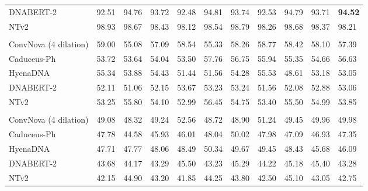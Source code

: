 \begin{table}[htbp]
{\begin{tabular}{lllllllllll}
    DNABERT-2 & 92.51  & 94.76  & 93.72  & 92.48  & 94.81  & 93.74  & 92.53  & 94.79  & 93.71  & \textbf{94.52} \\
    NTv2 & 98.93 & 98.67 & 98.43 & 98.12 & 98.54 & 98.79 & 98.26 & 98.68 & 98.37 & 98.21 \\
    \midrule
    \rowcolor{titlebg}\multicolumn{11}{l}{\textit{\textbf{Enhancer}}} \\
    \rowcolor{low}ConvNova (4 dilation)  & 59.00    & 55.08 & 57.09 & 58.54 & 55.33 & 58.26 & 58.77 & 58.42 & 58.10  & 57.39 \\
    Caduceus-Ph & 53.72 & 53.64 & 54.04 & 53.50  & 57.76 & 56.75 & 55.94 & 55.35 & 54.66 & 56.63 \\
    HyenaDNA & 55.34 & 53.88 & 54.43 & 51.44 & 51.56 & 54.28 & 55.53 & 48.61 & 53.18 & 53.05 \\
    DNABERT-2  & 52.11 & 51.06 & 52.15 & 53.67 & 53.23 & 53.24 & 51.56 & 52.08 & 52.88 & 53.06 \\
    NTv2 & 53.25 & 55.80 & 54.10 & 52.99 & 56.45 & 54.75 & 53.40 & 55.50 & 54.99 & 53.85 \\
    \midrule
    \rowcolor{titlebg}\multicolumn{11}{l}{\textit{\textbf{Enhancer Types}}} \\
    \rowcolor{low}ConvNova (4 dilation)  & 49.08 & 48.32 & 49.24 & 52.56 & 48.72 & 48.90  & 51.24 & 49.45 & 49.96 & 49.98 \\
    Caduceus-Ph  & 47.78 & 44.58 & 45.93 & 46.01 & 48.04 & 50.02 & 47.98 & 47.09 & 46.93 & 47.35 \\
    HyenaDNA & 47.71 & 47.77  & 48.06 & 48.49 & 50.34 & 49.67 & 49.45 & 48.43 & 45.68 & 46.09 \\
    DNABERT-2 & 43.68 & 44.17 & 43.29 & 45.50  & 43.23 & 45.29 & 44.22 & 45.18 & 45.40  & 43.28 \\
    NTv2 & 42.15 & 44.90 & 43.20 & 41.85 & 44.25 & 43.80 & 42.50 & 45.10 & 43.05 & 42.75 \\
\bottomrule
    \end{tabular}}
\end{table}

